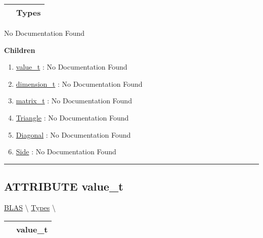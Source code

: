 {\renewcommand{\arraystretch}{1.5}
\begin{tabularx}{\textwidth}{|>{\raggedright\arraybackslash}l|X|}
\hline
\hspace{0pt}\mytexttt{\color{red} } & \textbf{Types} \\
\hline
\end{tabularx}
}

\par





No Documentation Found







\textbf{Children}
\begin{enumerate}
\item \hyperlink{ecldoc:blas.types.value_t}{value\_t}
: No Documentation Found
\item \hyperlink{ecldoc:blas.types.dimension_t}{dimension\_t}
: No Documentation Found
\item \hyperlink{ecldoc:blas.types.matrix_t}{matrix\_t}
: No Documentation Found
\item \hyperlink{ecldoc:ecldoc-Triangle}{Triangle}
: No Documentation Found
\item \hyperlink{ecldoc:ecldoc-Diagonal}{Diagonal}
: No Documentation Found
\item \hyperlink{ecldoc:ecldoc-Side}{Side}
: No Documentation Found
\end{enumerate}

\rule{\linewidth}{0.5pt}

\subsection*{\textsf{\colorbox{headtoc}{\color{white} ATTRIBUTE}
value\_t}}

\hypertarget{ecldoc:blas.types.value_t}{}
\hspace{0pt} \hyperlink{ecldoc:blas}{BLAS} \textbackslash 
\hspace{0pt} \hyperlink{ecldoc:BLAS.Types}{Types} \textbackslash 

{\renewcommand{\arraystretch}{1.5}
\begin{tabularx}{\textwidth}{|>{\raggedright\arraybackslash}l|X|}
\hline
\hspace{0pt}\mytexttt{\color{red} } & \textbf{value\_t} \\
\hline
\end{tabularx}
}

